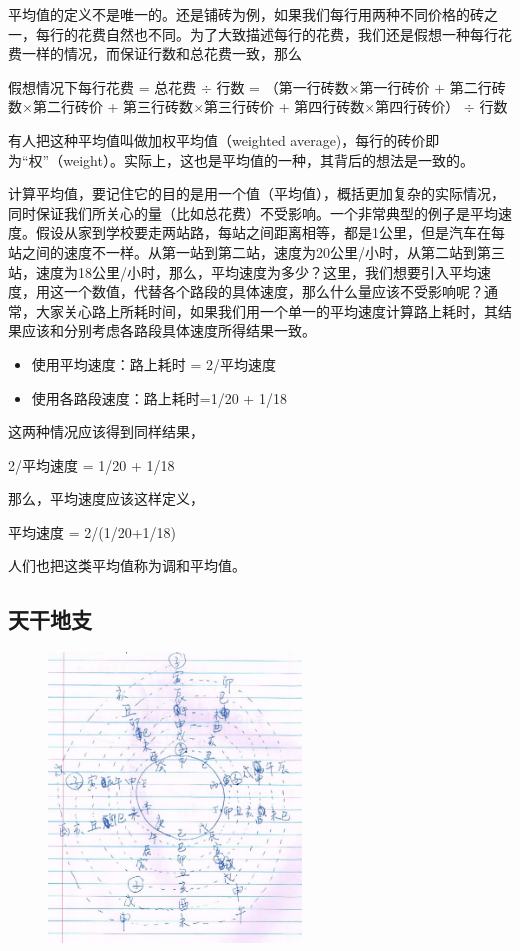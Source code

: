 平均值的定义不是唯一的。还是铺砖为例，如果我们每行用两种不同价格的砖之一，每行的花费自然也不同。为了大致描述每行的花费，我们还是假想一种每行花费一样的情况，而保证行数和总花费一致，那么

假想情况下每行花费 = 总花费 $\div$ 行数 = （第一行砖数$\times$第一行砖价 + 第二行砖数$\times$第二行砖价 + 第三行砖数$\times$第三行砖价 + 第四行砖数$\times$第四行砖价） $\div$ 行数

有人把这种平均值叫做加权平均值（weighted average)，每行的砖价即为“权”（weight）。实际上，这也是平均值的一种，其背后的想法是一致的。

计算平均值，要记住它的目的是用一个值（平均值），概括更加复杂的实际情况，同时保证我们所关心的量（比如总花费）不受影响。一个非常典型的例子是平均速度。假设从家到学校要走两站路，每站之间距离相等，都是1公里，但是汽车在每站之间的速度不一样。从第一站到第二站，速度为20公里/小时，从第二站到第三站，速度为18公里/小时，那么，平均速度为多少？这里，我们想要引入平均速度，用这一个数值，代替各个路段的具体速度，那么什么量应该不受影响呢？通常，大家关心路上所耗时间，如果我们用一个单一的平均速度计算路上耗时，其结果应该和分别考虑各路段具体速度所得结果一致。

\begin{itemize}
    \item 使用平均速度：路上耗时 = 2/平均速度
    \item 使用各路段速度：路上耗时=1/20 + 1/18
\end{itemize}
     
     这两种情况应该得到同样结果，

2/平均速度 = 1/20 + 1/18 

    那么，平均速度应该这样定义，
    
平均速度 = 2/(1/20+1/18) 

人们也把这类平均值称为调和平均值。

\subsection{天干地支}
\begin{figure}[h]
     \center
     \includegraphics[width=0.6\textwidth]{division_res/ganzhi}
     \caption{}
     \label{img_ganzhi}
\end{figure}




